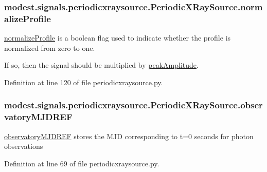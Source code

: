 \subsubsection[{\texorpdfstring{normalize\+Profile}{normalizeProfile}}]{\setlength{\rightskip}{0pt plus 5cm}modest.\+signals.\+periodicxraysource.\+Periodic\+X\+Ray\+Source.\+normalize\+Profile}\hypertarget{classmodest_1_1signals_1_1periodicxraysource_1_1PeriodicXRaySource_a61df217b2685c2ccf9b0220044849a3c}{}\label{classmodest_1_1signals_1_1periodicxraysource_1_1PeriodicXRaySource_a61df217b2685c2ccf9b0220044849a3c}


\hyperlink{classmodest_1_1signals_1_1periodicxraysource_1_1PeriodicXRaySource_a61df217b2685c2ccf9b0220044849a3c}{normalize\+Profile} is a boolean flag used to indicate whether the profile is normalized from zero to one. 

If so, then the signal should be multiplied by \hyperlink{classmodest_1_1signals_1_1periodicxraysource_1_1PeriodicXRaySource_a50a65021397b8cab83f2941e9b2d9036}{peak\+Amplitude}. 

Definition at line 120 of file periodicxraysource.\+py.

\subsubsection[{\texorpdfstring{observatory\+M\+J\+D\+R\+EF}{observatoryMJDREF}}]{\setlength{\rightskip}{0pt plus 5cm}modest.\+signals.\+periodicxraysource.\+Periodic\+X\+Ray\+Source.\+observatory\+M\+J\+D\+R\+EF}\hypertarget{classmodest_1_1signals_1_1periodicxraysource_1_1PeriodicXRaySource_a5300e5a9624bd81d7e2c8f2322653713}{}\label{classmodest_1_1signals_1_1periodicxraysource_1_1PeriodicXRaySource_a5300e5a9624bd81d7e2c8f2322653713}


\hyperlink{classmodest_1_1signals_1_1periodicxraysource_1_1PeriodicXRaySource_a5300e5a9624bd81d7e2c8f2322653713}{observatory\+M\+J\+D\+R\+EF} stores the M\+JD corresponding to t=0 seconds for photon observations 



Definition at line 69 of file periodicxraysource.\+py.


